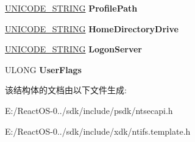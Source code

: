 \begin{DoxyCompactItemize}
\item 
\mbox{\label{struct___m_s_v1__0___i_n_t_e_r_a_c_t_i_v_e___p_r_o_f_i_l_e_a7e98932fdadd4d68020db981cd916da9}} 
\hyperlink{struct___u_n_i_c_o_d_e___s_t_r_i_n_g}{U\+N\+I\+C\+O\+D\+E\+\_\+\+S\+T\+R\+I\+NG} {\bfseries Profile\+Path}
\item 
\mbox{\label{struct___m_s_v1__0___i_n_t_e_r_a_c_t_i_v_e___p_r_o_f_i_l_e_ab69dec0c73de1cbb538f21ed24ec986f}} 
\hyperlink{struct___u_n_i_c_o_d_e___s_t_r_i_n_g}{U\+N\+I\+C\+O\+D\+E\+\_\+\+S\+T\+R\+I\+NG} {\bfseries Home\+Directory\+Drive}
\item 
\mbox{\label{struct___m_s_v1__0___i_n_t_e_r_a_c_t_i_v_e___p_r_o_f_i_l_e_a8770eab43c1b009e4aa75e58207c6e01}} 
\hyperlink{struct___u_n_i_c_o_d_e___s_t_r_i_n_g}{U\+N\+I\+C\+O\+D\+E\+\_\+\+S\+T\+R\+I\+NG} {\bfseries Logon\+Server}
\item 
\mbox{\label{struct___m_s_v1__0___i_n_t_e_r_a_c_t_i_v_e___p_r_o_f_i_l_e_a6a3906af8fe275f03dd20f3641f9ff2d}} 
U\+L\+O\+NG {\bfseries User\+Flags}
\end{DoxyCompactItemize}


该结构体的文档由以下文件生成\+:\begin{DoxyCompactItemize}
\item 
E\+:/\+React\+O\+S-\/0../sdk/include/psdk/ntsecapi.\+h\item 
E\+:/\+React\+O\+S-\/0../sdk/include/xdk/ntifs.\+template.\+h\end{DoxyCompactItemize}
